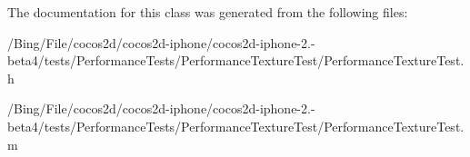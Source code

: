 The documentation for this class was generated from the following files\-:\begin{DoxyCompactItemize}
\item 
/\-Bing/\-File/cocos2d/cocos2d-\/iphone/cocos2d-\/iphone-\/2.-\/beta4/tests/\-Performance\-Tests/\-Performance\-Texture\-Test/Performance\-Texture\-Test.\-h\item 
/\-Bing/\-File/cocos2d/cocos2d-\/iphone/cocos2d-\/iphone-\/2.-\/beta4/tests/\-Performance\-Tests/\-Performance\-Texture\-Test/Performance\-Texture\-Test.\-m\end{DoxyCompactItemize}
